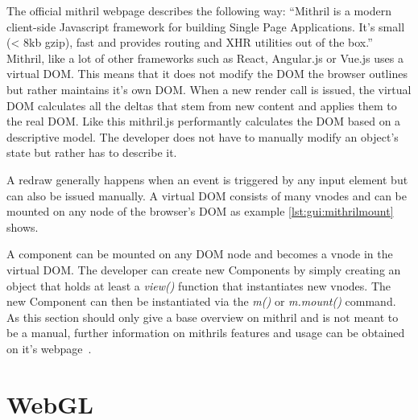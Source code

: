 The  official  mithril  webpage   describes    the  following
way: ``Mithril  is  a modern  client-side  Javascript  framework for  building
Single Page Applications. It's  small (< 8kb gzip), fast  and provides routing
and XHR utilities out of the  box.\cite{mithril:home}'' Mithril, like a lot of
other frameworks such as React, Angular.js  or Vue.js uses a virtual DOM. This
means  that  it does  not  modify  the DOM  the  browser  outlines but  rather
maintains it's  own DOM. When  a new  render call is  issued, the  virtual DOM
calculates all the deltas  that stem from new content and  applies them to the
real  DOM. Like this  mithril.js performantly  calculates the  DOM based  on a
descriptive model. The developer does not  have to manually modify an object's
state but rather has to describe it.

A redraw generally happens when an event is triggered by any input element but
can also be issued manually.
A virtual DOM  consists of many vnodes and  can be mounted on any  node of the
browser's DOM as example \ref{lst:gui:mithrilmount} shows.


A component can be mounted on any DOM  node and becomes a vnode in the virtual
DOM. The developer can create new Components by simply creating an object that
holds at least a \textit{view()} function that instantiates new vnodes.
The  new  Component   can  then  be  instantiated  via   the  \textit{m()}  or
\textit{m.mount()} command.
As this section should  only give a base overview on mithril  and is not meant
to be  a manual,  further information  on mithrils features  and usage  can be
obtained on it's webpage~\cite{mithril:home}.
%
%
\section{WebGL} %
\label{sec:app:gui:webgl}


